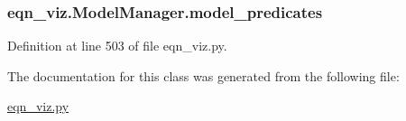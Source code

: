 \subsubsection[{model\+\_\+predicates}]{\setlength{\rightskip}{0pt plus 5cm}eqn\+\_\+viz.\+Model\+Manager.\+model\+\_\+predicates}\label{classeqn__viz_1_1_model_manager_a6b199994d8ecef6d3f7ccfa73bcabd04}


Definition at line 503 of file eqn\+\_\+viz.\+py.



The documentation for this class was generated from the following file\+:\begin{DoxyCompactItemize}
\item 
\hyperlink{eqn__viz_8py}{eqn\+\_\+viz.\+py}\end{DoxyCompactItemize}
